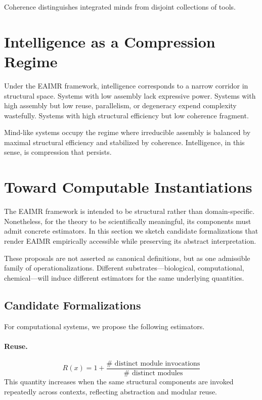 \documentclass[11pt,letterpaper]{article}
\begin{document}
Coherence distinguishes integrated minds from disjoint collections of tools.

\section{Intelligence as a Compression Regime}

Under the EAIMR framework, intelligence corresponds to a narrow corridor in structural space. Systems with low assembly lack expressive power. Systems with high assembly but low reuse, parallelism, or degeneracy expend complexity wastefully. Systems with high structural efficiency but low coherence fragment.

Mind-like systems occupy the regime where irreducible assembly is balanced by maximal structural efficiency and stabilized by coherence. Intelligence, in this sense, is compression that persists.

\section{Toward Computable Instantiations}

The EAIMR framework is intended to be structural rather than domain-specific. Nonetheless, for the theory to be scientifically meaningful, its components must admit concrete estimators. In this section we sketch candidate formalizations that render EAIMR empirically accessible while preserving its abstract interpretation.

These proposals are not asserted as canonical definitions, but as one admissible family of operationalizations. Different substrates—biological, computational, chemical—will induce different estimators for the same underlying quantities.

\subsection{Candidate Formalizations}

For computational systems, we propose the following estimators.

\paragraph{Reuse.}
\[
R(x) = 1 + \frac{\#\text{ distinct module invocations}}{\#\text{ distinct modules}}
\]
This quantity increases when the same structural components are invoked repeatedly across contexts, reflecting abstraction and modular reuse.
\end{document}
